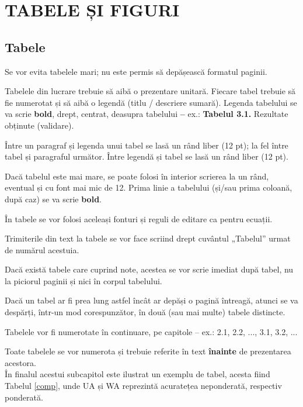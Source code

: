 \chapter{TABELE ȘI FIGURI}

\section{Tabele}

Se vor evita tabelele mari; nu este permis să depășească formatul paginii.

Tabelele din lucrare trebuie să aibă o prezentare unitară. Fiecare tabel trebuie să fie numerotat și să aibă o legendă (titlu / descriere sumară). Legenda tabelului se va scrie \textbf{bold}, drept, centrat, deasupra tabelului \textbf{--} ex.: \textbf{Tabelul 3.1.} Rezultate obținute (validare).

Între un paragraf și legenda unui tabel se lasă un rând liber (12 pt); la fel între tabel și paragraful următor. Între legendă și tabel se lasă un rând liber (12 pt).

Dacă tabelul este mai mare, se poate folosi în interior scrierea la un rând, eventual și cu font mai mic de 12. Prima linie a tabelului (și/sau prima coloană, după caz) se va scrie \textbf{bold}.

În tabele se vor folosi aceleași fonturi și reguli de editare ca pentru ecuații.

Trimiterile din text la tabele se vor face scriind drept cuvântul „Tabelul” urmat de numărul acestuia.

Dacă există tabele care cuprind note, acestea se vor scrie imediat după tabel, nu la piciorul paginii și nici în corpul tabelului.

Dacă un tabel ar fi prea lung astfel încât ar depăși o pagină întreagă, atunci se va despărți, într-un mod corespunzător, în două (sau mai multe) tabele distincte.

Tabelele vor fi numerotate în continuare, pe capitole – ex.: 2.1, 2.2, ..., 3.1, 3.2, ...

Toate tabelele se vor numerota și trebuie referite în text \textbf{înainte} de prezentarea acestora. \\

În finalul acestui subcapitol este ilustrat un exemplu de tabel, acesta fiind Tabelul \ref{comp}, unde UA și WA reprezintă acuratețea neponderată, respectiv ponderată.

\vfill

